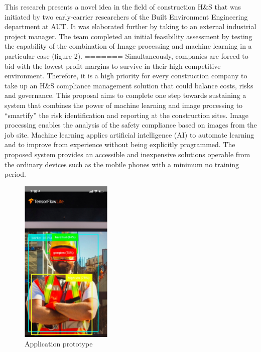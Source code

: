 \documentclass{article}
\begin{document}
This research presents a novel idea in the field of construction H\&S that was initiated by two early-carrier researchers of the Built Environment Engineering department at AUT. It was elaborated further by taking to an external industrial project manager.
The team completed an initial feasibility assessment by testing the capability of the combination of Image processing and machine learning in a particular case (figure 2).
=======
Simultaneously, companies are forced to bid with the lowest profit margins to survive in their high competitive environment. 
Therefore, it is a high priority for every construction company to take up an H\&S compliance management solution that could balance costs, risks and governance.
This proposal aims to complete one step towards sustaining a system that combines the power of machine learning and image processing to ``smartify'' the risk identification and reporting at the construction sites. Image processing enables the analysis of the safety compliance based on images from the job site.
Machine learning applies artificial intelligence (AI) to automate learning and to improve from experience without being explicitly programmed.
The proposed system provides an accessible and inexpensive solutions operable from the ordinary devices such as the mobile phones with a minimum no training period.

\begin{figure}[htbp]
\centering
\includegraphics[height=300]{./Images/fig_02.png}
\caption{\label{fig:org5a11501}Application prototype}
\end{figure}
\end{document}
